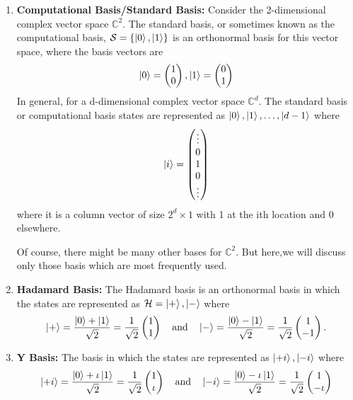 \begin{enumerate}
    \item \begin{definition}
        \textbf{Computational Basis/Standard Basis:} Consider the 2-dimensional complex vector space $\mathbb{C}^2$. The standard basis, or sometimes known as the computational basis, $\mathcal{S}=\{\ket{0},\ket{1}\}$ is an orthonormal basis for this vector space, where the basis vectors are
        \[
        \ket{0}=\begin{pmatrix} 1 \\ 0 \end{pmatrix}, \ket{1}=\begin{pmatrix} 0 \\ 1 \end{pmatrix}
        \]
        In general, for a d-dimensional complex vector space $\mathbb{C}^d$. The standard basis or computational basis states are represented as $\ket{0},\ket{1},\ldots,\ket{d-1}$ where
        \[
        \ket{i}=\begin{pmatrix} \vdots \\ 0 \\ 1 \\ 0 \\ \vdots \\ \end{pmatrix}
        \]
        where it is a column vector of size $2^d \times 1$ with 1 at the ith location and 0 elsewhere.
    \end{definition}
Of course, there might be many other bases for $\mathbb{C}^2$. But here,we will discuss only those basis which are most frequently used.
    \item \begin{definition}\textbf{Hadamard Basis:} The Hadamard basis is an orthonormal basis in which the states are represented as $\mathcal{H}=\ket{+},\ket{-}$ where 
    \[\ket{+}=\dfrac{\ket{0}+\ket{1}}{\sqrt{2}}=\frac{1}{\sqrt{2}}\begin{pmatrix} 1 \\ 1 \end{pmatrix} \quad \text{and} \quad \ket{-}=\dfrac{\ket{0}-\ket{1}}{\sqrt{2}}=\frac{1}{\sqrt{2}}\begin{pmatrix} 1 \\-1\end{pmatrix}.
    \]
    \end{definition}
    \item \textbf{Y Basis:} The basis in which the states are represented as $\ket{+i},\ket{-i}$ where 
    \[\ket{+i}=\dfrac{\ket{0}+\iota\ket{1}}{\sqrt{2}}=\frac{1}{\sqrt{2}}\begin{pmatrix} 1 \\ \iota \end{pmatrix} \quad \text{and} \quad \ket{-i}=\dfrac{\ket{0}-\iota\ket{1}}{\sqrt{2}}=\frac{1}{\sqrt{2}}\begin{pmatrix} 1 \\ -\iota \end{pmatrix}
    \]
\end{enumerate}

